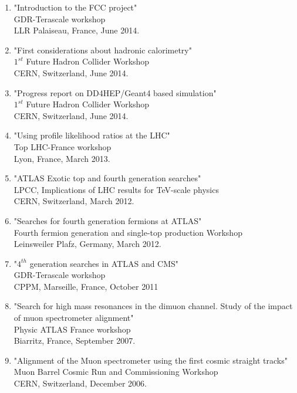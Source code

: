 \documentclass[12pt]{article}
\begin{document}
\begin{enumerate}
\item "Introduction to the FCC project"\\
GDR-Terascale workshop\\
 LLR Palaiseau, France, June 2014.

\item "First considerations about hadronic calorimetry"\\
$1^{st}$ Future Hadron Collider Workshop\\
CERN, Switzerland, June 2014.

\item "Progress report on DD4HEP/Geant4 based simulation"\\
$1^{st}$ Future Hadron Collider Workshop\\
CERN, Switzerland, June 2014.



\item "Using profile likelihood ratios at the LHC"\\
Top LHC-France workshop \\
Lyon, France, March 2013.

\item "ATLAS Exotic top and fourth generation searches"\\
LPCC, Implications of LHC results for TeV-scale physics\\
CERN, Switzerland, March 2012.

\item "Searches for fourth generation fermions at ATLAS"\\
Fourth fermion generation and single-top production Workshop\\
Leinsweiler Plafz, Germany, March 2012.

\item "$4^{th}$ generation searches in ATLAS and CMS"\\
GDR-Terascale workshop\\
CPPM, Marseille, France, October 2011


\item "Search for high mass resonances in the dimuon channel. Study of the impact of muon spectrometer alignment"\\
Physic ATLAS France workshop\\
 Biarritz, France, September 2007.	

\item "Alignment of the Muon spectrometer using the first cosmic straight tracks"\\
Muon Barrel Cosmic Run and Commissioning Workshop\\
CERN, Switzerland, December 2006.


\end{enumerate}
\end{document}
